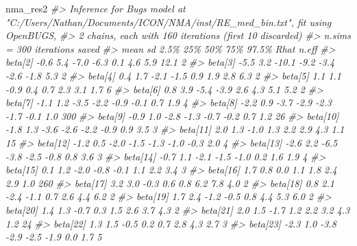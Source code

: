 \documentclass[
]{article}
\newenvironment{Shaded}{\begin{snugshade}}{\end{snugshade}}
\newcommand{\CommentTok}[1]{\textcolor[rgb]{0.56,0.35,0.01}{\textit{#1}}}
\newcommand{\NormalTok}[1]{#1}
\begin{document}
\begin{Shaded}
\begin{Highlighting}[]
\NormalTok{nma\_res2}
\CommentTok{\#\textgreater{} Inference for Bugs model at "C:/Users/Nathan/Documents/ICON/NMA/inst/RE\_med\_bin.txt", fit using OpenBUGS,}
\CommentTok{\#\textgreater{}  2 chains, each with 160 iterations (first 10 discarded)}
\CommentTok{\#\textgreater{}  n.sims = 300 iterations saved}
\CommentTok{\#\textgreater{}            mean    sd  2.5\%   25\%   50\%   75\%  97.5\% Rhat n.eff}
\CommentTok{\#\textgreater{} beta[2]    {-}0.6   5.4  {-}7.0  {-}6.3   0.1   4.6    5.9 12.1     2}
\CommentTok{\#\textgreater{} beta[3]    {-}5.5   3.2 {-}10.1  {-}9.2  {-}3.4  {-}2.6   {-}1.8  5.3     2}
\CommentTok{\#\textgreater{} beta[4]     0.4   1.7  {-}2.1  {-}1.5   0.9   1.9    2.8  6.3     2}
\CommentTok{\#\textgreater{} beta[5]     1.1   1.1  {-}0.9   0.4   0.7   2.3    3.1  1.7     6}
\CommentTok{\#\textgreater{} beta[6]     0.8   3.9  {-}5.4  {-}3.9   2.6   4.3    5.1  5.2     2}
\CommentTok{\#\textgreater{} beta[7]    {-}1.1   1.2  {-}3.5  {-}2.2  {-}0.9  {-}0.1    0.7  1.9     4}
\CommentTok{\#\textgreater{} beta[8]    {-}2.2   0.9  {-}3.7  {-}2.9  {-}2.3  {-}1.7   {-}0.1  1.0   300}
\CommentTok{\#\textgreater{} beta[9]    {-}0.9   1.0  {-}2.8  {-}1.3  {-}0.7  {-}0.2    0.7  1.2    26}
\CommentTok{\#\textgreater{} beta[10]   {-}1.8   1.3  {-}3.6  {-}2.6  {-}2.2  {-}0.9    0.9  3.5     3}
\CommentTok{\#\textgreater{} beta[11]    2.0   1.3  {-}1.0   1.3   2.2   2.9    4.3  1.1    15}
\CommentTok{\#\textgreater{} beta[12]   {-}1.2   0.5  {-}2.0  {-}1.5  {-}1.3  {-}1.0   {-}0.3  2.0     4}
\CommentTok{\#\textgreater{} beta[13]   {-}2.6   2.2  {-}6.5  {-}3.8  {-}2.5  {-}0.8    0.8  3.6     3}
\CommentTok{\#\textgreater{} beta[14]   {-}0.7   1.1  {-}2.1  {-}1.5  {-}1.0   0.2    1.6  1.9     4}
\CommentTok{\#\textgreater{} beta[15]    0.1   1.2  {-}2.0  {-}0.8  {-}0.1   1.1    2.2  3.4     3}
\CommentTok{\#\textgreater{} beta[16]    1.7   0.8   0.0   1.1   1.8   2.4    2.9  1.0   260}
\CommentTok{\#\textgreater{} beta[17]    3.2   3.0  {-}0.3   0.6   0.8   6.2    7.8  4.0     2}
\CommentTok{\#\textgreater{} beta[18]    0.8   2.1  {-}2.4  {-}1.1   0.7   2.6    4.4  6.2     2}
\CommentTok{\#\textgreater{} beta[19]    1.7   2.4  {-}1.2  {-}0.5   0.8   4.4    5.3  6.0     2}
\CommentTok{\#\textgreater{} beta[20]    1.4   1.3  {-}0.7   0.3   1.5   2.6    3.7  4.3     2}
\CommentTok{\#\textgreater{} beta[21]    2.0   1.5  {-}1.7   1.2   2.2   3.2    4.3  1.2    24}
\CommentTok{\#\textgreater{} beta[22]    1.3   1.5  {-}0.5   0.2   0.7   2.8    4.3  2.7     3}
\CommentTok{\#\textgreater{} beta[23]   {-}2.3   1.0  {-}3.8  {-}2.9  {-}2.5  {-}1.9    0.0  1.7     5}

\end{Highlighting}
\end{Shaded}
\end{document}
